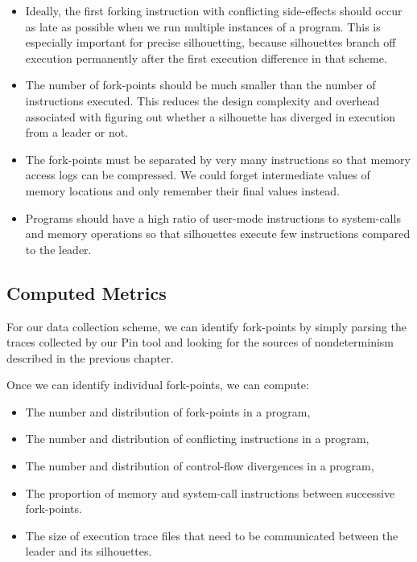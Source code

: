 \begin{itemize}
\item Ideally, the first forking instruction
with conflicting side-effects should occur as late as possible 
when we run multiple instances of a program. 
This is especially important for precise silhouetting,
because silhouettes branch off execution
permanently after the first execution
difference in that scheme.

\item The number of fork-points should
be much smaller than the number of instructions executed.
This reduces the design complexity and overhead associated with 
figuring out whether a silhouette has diverged
in execution from a leader or not.

\item The fork-points must be separated 
by very many instructions so that
memory access logs can be compressed. 
We could forget intermediate
values of memory locations and only
remember their final values instead.

\item Programs should have a high
ratio of user-mode instructions to system-calls
and memory operations so that
silhouettes execute few
instructions compared to
the leader.

\end{itemize}

\subsection{Computed Metrics}
For our data collection scheme, we can identify fork-points by 
simply parsing the traces collected by our Pin tool
and looking for the sources of nondeterminism described in the previous
chapter. 

Once we can identify individual fork-points, we can compute:
\begin{itemize}
\item The number and distribution of fork-points in a program,
\item The number and distribution of conflicting instructions in a program,
\item The number and distribution of control-flow divergences in a program,
\item The proportion of memory and system-call instructions between successive fork-points.
\item The size of execution trace files that need to be communicated between
  the leader and its silhouettes.
\end{itemize}

